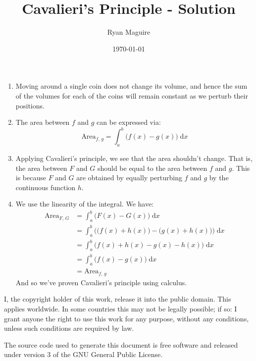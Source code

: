 \documentclass{article}
\title{Cavalieri's Principle - Solution}
\author{Ryan Maguire}
\date{\today}
\begin{document}
    \maketitle
    \begin{enumerate}
        \item
            Moving around a single coin does not change its volume, and
            hence the sum of the volumes for each of the coins will remain
            constant as we perturb their positions.
        \item
            The area between $f$ and $g$ can be expressed via:
            \begin{equation}
                \textrm{Area}_{f,\,g}
                =\int_{a}^{b}\big(f(x)-g(x)\big)\;\textrm{d}x
            \end{equation}
        \item
            Applying Cavalieri's principle, we see that the area shouldn't
            change. That is, the area between $F$ and $G$ should be equal to
            the area between $f$ and $g$. This is because $F$ and $G$ are
            obtained by equally perturbing $f$ and $g$ by the continuous
            function $h$.
        \item
            We use the linearity of the integral. We have:
            \begin{align}
                \textrm{Area}_{F,\,G}
                &=\int_{a}^{b}\big(F(x)-G(x)\big)\;\textrm{d}x\\
                &=\int_{a}^{b}\Big(\big(f(x)+h(x)\big)-\big(g(x)+h(x)\big)\Big)
                    \;\textrm{d}x\\
                &=\int_{a}^{b}\big(f(x)+h(x)-g(x)-h(x)\big)\;\textrm{d}x\\
                &=\int_{a}^{b}\big(f(x)-g(x)\big)\;\textrm{d}x\\
                &=\textrm{Area}_{f,\,g}
            \end{align}
            And so we've proven Cavalieri's principle using calculus.
    \end{enumerate}
    \newpage
    I, the copyright holder of this work, release it into the public domain.
    This applies worldwide. In some countries this may not be legally possible;
    if so: I grant anyone the right to use this work for any purpose, without
    any conditions, unless such conditions are required by law.
    \par\hfill\par
    The source code used to generate this document is free software and released
    under version 3 of the GNU General Public License.
\end{document}
